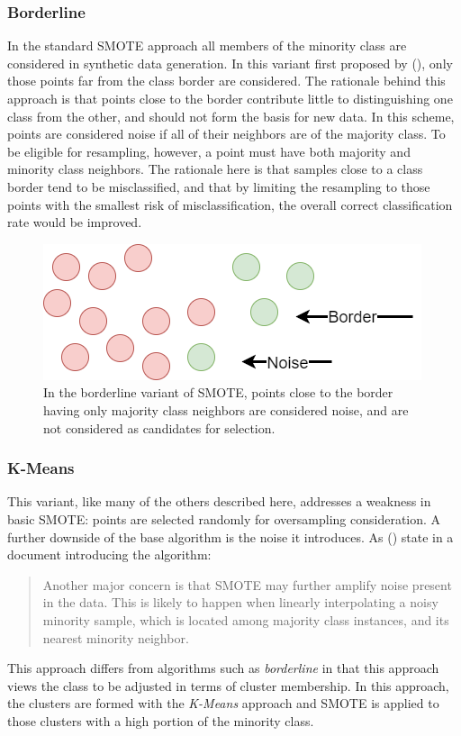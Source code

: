 \documentclass[letterpaper, notitlepage]{report}
\begin{document}
\subsubsection{Borderline}
In the standard SMOTE approach all members of the minority class are considered in synthetic data generation. In this variant first proposed by \citeauthor{Han2005-ui} (\citeyear{Han2005-ui}), only those points far from the class border are considered. The rationale behind this approach is that points close to the border contribute little to distinguishing one class from the other, and should not form the basis for new data. In this scheme, points are considered noise if all of their neighbors are of the majority class. To be eligible for resampling, however, a point must have both majority and minority class neighbors. The rationale here is that samples close to a class border tend to be misclassified, and that by limiting the resampling to those points with the smallest risk of misclassification, the overall correct classification rate would be improved.
\begin{figure}[H]
	\centering
	\includegraphics[scale=0.30]{./figures/borderline.png}
	\caption[Borderline selection of synthetic data points]{In the borderline variant of SMOTE, points close to the border having only majority class neighbors are considered noise, and are not considered as candidates for selection. }
	\label{fig:borderline}
\end{figure}
%
%


\subsubsection{K-Means}
This variant, like many of the others described here, addresses a weakness in basic SMOTE: points are selected randomly for oversampling consideration. A further downside of the base algorithm is the noise it introduces. As \citeauthor{Last2017-rh} (\citeyear{Last2017-rh}) state in a document introducing the algorithm:
\begin{quote}
Another major concern is that SMOTE may further amplify noise present in the data. This is likely
to happen when linearly interpolating a noisy minority sample, which is located among majority class
instances, and its nearest minority neighbor. \parencite{Last2017-rh}
\end{quote}
This approach differs from algorithms such as \textit{borderline} in that this approach views the class to be adjusted in terms of cluster membership.  In this approach, the clusters are formed with the \textit{K-Means} approach and SMOTE is applied to those clusters with a high portion of the minority class.
\end{document}
